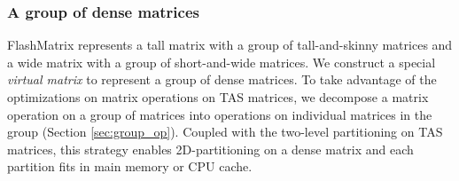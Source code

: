 \subsubsection{A group of dense matrices} \label{sec:mat_group}
FlashMatrix represents a tall matrix with a group of
tall-and-skinny matrices and a wide matrix with a group of short-and-wide
matrices. We construct a special \textit{virtual matrix} to represent
a group of dense matrices. To take advantage of the optimizations on matrix
operations on TAS matrices, we decompose a matrix operation on a group of
matrices into operations on individual matrices in the group (Section
\ref{sec:group_op}).
Coupled with the two-level partitioning on TAS matrices, this strategy enables
2D-partitioning on a dense matrix and each partition fits in main memory
or CPU cache.







